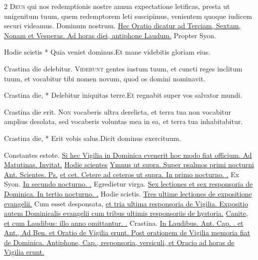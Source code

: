 \begin{multicols*}{2}
\lettrine[lines=2]{\zallmancaps \color{Red} D}{eus} \hypertarget{oratio-nativitatis-domini}{qui} nos redemptionis nostre annua expectatione letificas, presta ut unigenitum tuum, quem redemptorem leti suscipimus, venientem quoque iudicem securi videamus. Dominum nostrum.
\newline \ul{Hec Oratio dicatur ad Terciam, Sextam, Nonam et Vesperas. Ad horas diei, antiphone Laudum.}
 Propter Syon.
\begin{responsory-breve}
{Hodie scietis * Quia veniet dominus.}{Et mane videbitis gloriam eius.}
\end{responsory-breve}%
\V Crastina die delebitur.
\lettrine[lines=2]{\zallmancaps \color{Blue} V}{idebunt} gentes iustum tuum, et cuncti reges inclitum tuum, et vocabitur tibi nomen novum, quod os domini nominavit.
\begin{responsory-breve}
{Crastina die, * Delebitur iniquitas terre.}{Et regnabit super vos salvator mundi.}
\end{responsory-breve}%
\V Crastina die erit.
\lettrine[lines=2]{\zallmancaps \color{Red} N}{on} vocaberis ultra derelicta, et terra tua non vocabitur amplius desolata, sed vocaberis voluntas mea in ea, et terra tua inhabitabitur.
\begin{responsory-breve}
{Crastina die, * Erit vobis salus.}{Dicit dominus exercituum.}
\end{responsory-breve}%
\V Constantes estote.
\newline \ul{Si hec Vigilia in Dominica evenerit hoc modo fiat officium. Ad Matutinas. Invitat.} \hyperlink{hodie-scietis}{Hodie scientes} \ul{Ymnus ut supra. Super psalmos primi nocturni Ant. Scientes. Ps.}  \ul{et cet. Cetere ad ceteros ut supra. In primo nocturno. \Vbar .} Ex Syon. \ul{In secundo nocturno. \Vbar .} Egredietur virga. \ul{Sex lectiones et sex responsoria de Dominica. In tertio nocturno. \Vbar .} Hodie scietis. \ul{Tres ultime lectiones de expositione evangelii.} Cum esset desponsata, \ul{et tria ultima responsoria de Vigilia. Expositio autem Dominicalis evangelii cum tribus ultimis responsoriis de hystoria.} \hyperlink{canite-tuba}{Canite,} \ul{et cum Laudibus: illo anno omittantur. \Vbar .} Crastina. \ul{In Laudibus. Ant. Cap. \Vbar . et Ant., Ad Ben. et Oratio de Vigilia erunt. Post orationem de Vigilia memoria fiat de Dominica. Antiphone, Cap., responsoria, versiculi, et Oracio ad horas de Vigilia erunt.}

\end{multicols*}
